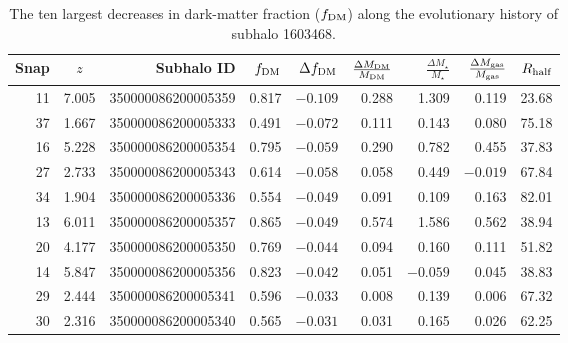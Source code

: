 \documentclass[twocolumn]{openjournal}
\begin{document}
\begin{table}[ht]
\centering
\caption{The ten largest decreases in dark-matter fraction ($f_{\rm DM}$) along the evolutionary history of subhalo 1603468.}
\label{Largest Drops 1603468}
\scriptsize
\setlength{\tabcolsep}{1.5pt}
\begin{tabularx}{\columnwidth}{@{}r c r r r r r r r@{}}
\hline
\textbf{Snap} & $z$ & \textbf{Subhalo ID} & $f_{\rm DM}$ & $\Delta f_{\rm DM}$ & $\frac{\Delta M_{\rm DM}}{M_{\rm DM}}$ & $\frac{\Delta M_{\star}}{M_{\star}}$ & $\frac{\Delta M_{\rm gas}}{M_{\rm gas}}$ & $R_{\rm half}$ \\
\hline
11 & 7.005 & 350000086200005359 & 0.817 & $-0.109$ & 0.288 & 1.309 & 0.119 & 23.68 \\
37 & 1.667 & 350000086200005333 & 0.491 & $-0.072$ & 0.111 & 0.143 & 0.080 & 75.18 \\
16 & 5.228 & 350000086200005354 & 0.795 & $-0.059$ & 0.290 & 0.782 & 0.455 & 37.83 \\
27 & 2.733 & 350000086200005343 & 0.614 & $-0.058$ & 0.058 & 0.449 & $-0.019$ & 67.84 \\
34 & 1.904 & 350000086200005336 & 0.554 & $-0.049$ & 0.091 & 0.109 & 0.163 & 82.01 \\
13 & 6.011 & 350000086200005357 & 0.865 & $-0.049$ & 0.574 & 1.586 & 0.562 & 38.94 \\
20 & 4.177 & 350000086200005350 & 0.769 & $-0.044$ & 0.094 & 0.160 & 0.111 & 51.82 \\
14 & 5.847 & 350000086200005356 & 0.823 & $-0.042$ & 0.051 & $-0.059$ & 0.045 & 38.83 \\
29 & 2.444 & 350000086200005341 & 0.596 & $-0.033$ & 0.008 & 0.139 & 0.006 & 67.32 \\
30 & 2.316 & 350000086200005340 & 0.565 & $-0.031$ & 0.031 & 0.165 & 0.026 & 62.25 \\
\hline
\end{tabularx}
\end{table}
\end{document}
